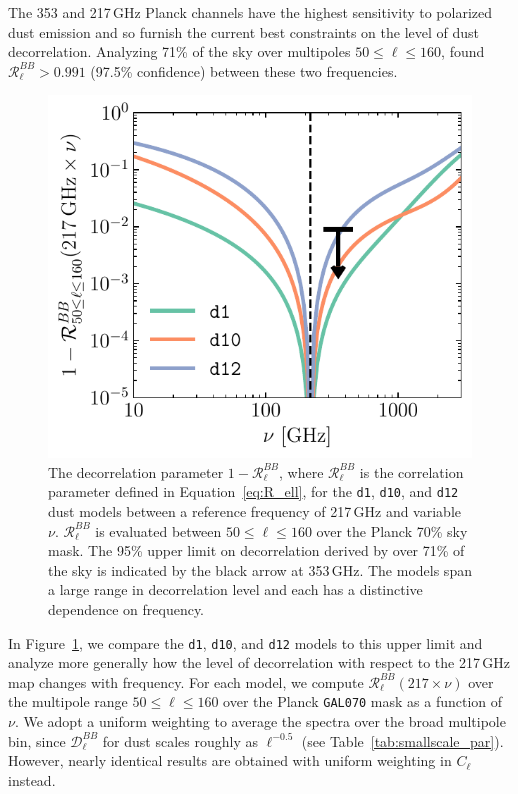 \documentclass[twocolumn]{aastex631}
\begin{document}
The 353 and 217\,GHz Planck channels have the highest sensitivity to polarized dust emission and so furnish the current best constraints on the level of dust decorrelation. Analyzing 71\% of the sky over multipoles $50 \leq \ell \leq 160$, \citet{planck2016-l11A} found $\mathcal{R}_\ell^{BB} > 0.991$ (97.5\% confidence) between these two frequencies.

\begin{figure}
    \centering
    \includegraphics[width=\columnwidth]{figures/decorrelation_dust.pdf}
    \caption{The decorrelation parameter $1-\mathcal{R}_\ell^{BB}$, where $\mathcal{R}_\ell^{BB}$ is the correlation parameter defined in Equation~\eqref{eq:R_ell}, for the \texttt{d1}, \texttt{d10}, and \texttt{d12} dust models between a reference frequency of 217\,GHz and variable $\nu$. $\mathcal{R}_\ell^{BB}$ is evaluated between $50 \leq \ell \leq 160$ over the Planck 70\% sky mask. The 95\% upper limit on decorrelation derived by \citet{planck2016-l11A} over 71\% of the sky is indicated by the black arrow at 353\,GHz. The models span a large range in decorrelation level and each has a distinctive dependence on frequency.}
    \label{fig:decorrelation}
\end{figure}

In Figure~\ref{fig:decorrelation}, we compare the \texttt{d1}, \texttt{d10}, and \texttt{d12} models to this upper limit and analyze more generally how the level of decorrelation with respect to the 217\,GHz map changes with frequency. For each model, we compute $\mathcal{R}_\ell^{BB}\left(217\times\nu\right)$ over the multipole range $50 \leq \ell \leq 160$ over the Planck \texttt{GAL070} mask as a function of $\nu$. We adopt a uniform weighting to average the spectra over the broad multipole bin, since $\mathcal{D}_\ell^{BB}$ for dust scales roughly as $\ell^{-0.5}$ (see Table~\ref{tab:smallscale_par}). However, nearly identical results are obtained with uniform weighting in $C_\ell$ instead.
\end{document}
